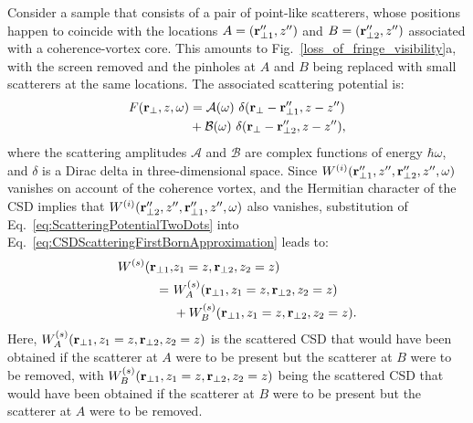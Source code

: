 \documentclass[%
 reprint,
 amsmath,amssymb,
 aps,
]{revtex4-1}
\begin{document}
Consider a sample that consists of a pair of point-like scatterers, whose positions happen to coincide with the locations $A=({\bf r}_{\perp 1}'',z'')$ and $B=({\bf r}_{\perp 2}'',z'')$ associated with a coherence-vortex core. This amounts to Fig.~\ref{loss_of_fringe_visibility}a, with the screen removed and the pinholes at $A$ and $B$ being replaced with small scatterers at the same locations.  The associated scattering potential is:
\begin{equation}
\begin{aligned}
F({\bf r}_{\perp},z,\omega) &= \mathcal{A}(\omega)~ \delta({\bf r}_{\perp}-{\bf r}_{\perp 1}'',z-z'') \\ &+ \mathcal{B}(\omega) ~\delta({\bf r}_{\perp}-{\bf r}_{\perp 2}'',z-z''),
\label{eq:ScatteringPotentialTwoDots}
\end{aligned}
\end{equation}
where the scattering amplitudes $\mathcal{A}$ and $\mathcal{B}$ are complex functions of energy $\hbar\omega$, and $\delta$ is a Dirac delta in three-dimensional space.   Since $W^{(i)}({\bf r}_{\perp 1}'',z'',{\bf r}_{\perp 2}'',z'',\omega)$ vanishes on account of the coherence vortex, and the Hermitian character of the CSD \cite{mandel_wolf} implies that $W^{(i)}({\bf r}_{\perp 2}'',z'',{\bf r}_{\perp 1}'',z'',\omega)$ also vanishes, substitution of Eq.~\ref{eq:ScatteringPotentialTwoDots} into Eq.~\ref{eq:CSDScatteringFirstBornApproximation} leads to:
\begin{equation}
\begin{aligned}
\label{eq:CSDsforTwoScattersAtCVCore}
W^{(s)} ({\bf r}_{\perp 1}, &z_1=z, {\bf r}_{\perp 2},z_2=z) \\ = ~ &W^{(s)}_A ({\bf r}_{\perp 1}, z_1=z,  {\bf r}_{\perp 2},z_2=z) \\ &+ W^{(s)}_B ({\bf r}_{\perp 1}, z_1=z, {\bf r}_{\perp 2},z_2=z).
\end{aligned}
\end{equation}
Here, $W^{(s)}_A ({\bf r}_{\perp 1}, z_1=z, {\bf r}_{\perp 2},z_2=z)$ is the scattered CSD that would have been obtained if the scatterer at $A$ were to be present but the scatterer at $B$ were to be removed, with $W^{(s)}_B ({\bf r}_{\perp 1}, z_1=z, {\bf r}_{\perp 2},z_2=z)$ being the scattered CSD that would have been obtained if the scatterer at $B$ were to be present but the scatterer at $A$ were to be removed.  
\end{document}
